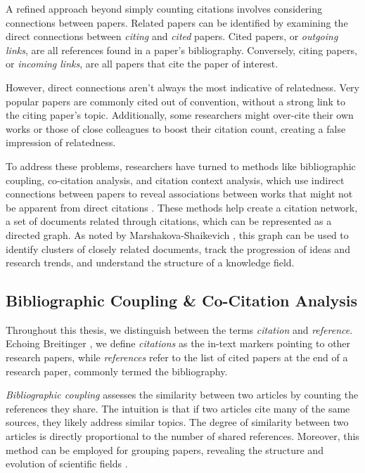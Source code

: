 A refined approach beyond simply counting citations involves considering connections between papers.
Related papers can be identified by examining the direct connections between \emph{citing} and \emph{cited} papers. Cited papers, or \emph{outgoing links}, are all references found in a paper's bibliography. Conversely, citing papers, or \emph{incoming links}, are all papers that cite the paper of interest.

However, direct connections aren't always the most indicative of relatedness.
Very popular papers are commonly cited out of convention, without a strong link to the citing paper's topic.
Additionally, some researchers might over-cite their own works or those of close colleagues to boost their citation count, creating a false impression of relatedness.

To address these problems, researchers have turned to methods like bibliographic coupling, co-citation analysis, and citation context analysis, which use indirect connections between papers to reveal associations between works that might not be apparent from direct citations \cite{SmithCitationAnalysis1981}. These methods help create a citation network, a set of documents related through citations, which can be represented as a directed graph. As noted by Marshakova-Shaikevich \cite{Marshakova-ShaikevichSystemDocument1973}, this graph can be used to identify clusters of closely related documents, track the progression of ideas and research trends, and understand the structure of a knowledge field.


\subsection{Bibliographic Coupling \& Co-Citation Analysis} \label{sec:bibliographic-coupling-co-citation-analysis}

Throughout this thesis, we distinguish between the terms \emph{citation} and \emph{reference}. Echoing Breitinger \cite{BreitingerAcademicLiterature2023}, we define \emph{citations} as the in-text markers pointing to other research papers, while \emph{references} refer to the list of cited papers at the end of a research paper, commonly termed the bibliography.

\emph{Bibliographic coupling} assesses the similarity between two articles by counting the references they share. The intuition is that if two articles cite many of the same sources, they likely address similar topics. The degree of similarity between two articles is directly proportional to the number of shared references. Moreover, this method can be employed for grouping papers, revealing the structure and evolution of scientific fields \cite{KesslerBibliographicCoupling1963,GippCitationProximity2009}.

